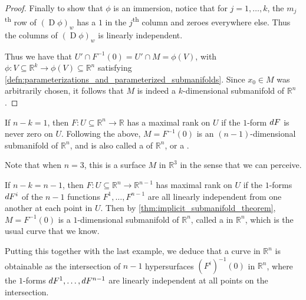 \documentclass[notoc,notitlepage]{tufte-book}
\DeclareMathOperator{\D}{D}
\begin{document}
\begin{proof}
  Finally to show that $\phi$ is an immersion, notice that for $j = 1, \ldots,
  k$, the $m_j$\textsuperscript{th} row of $(\D \phi)_w$ has a $1$ in the
  $j$\textsuperscript{th} column and zeroes everywhere else. Thus the columns of
  $(\D \phi)_w$ is linearly independent.

  Thus we have that $U' \cap F^{-1}(0) = U' \cap M = \phi(V)$, with $\phi : V
  \subseteq \mathbb{R}^k \to \phi(V) \subseteq \mathbb{R}^n$ satisfying
  \cref{defn:parameterizations_and_parameterized_submanifolds}. Since $x_0 \in M$
  was arbitrarily chosen, it follows that $M$ is indeed a $k$-dimensional
  submanifold of $\mathbb{R}^n$.
\end{proof}

\begin{eg}
  If $n - k = 1$, then $F : U \subseteq \mathbb{R}^n \to \mathbb{R}$ has a
  maximal rank on $U$ if the $1$-form $\mathop{}\!d{F}$ is never zero on $U$. Following
  the above, $M = F^{-1}(0)$ is an $(n - 1)$-dimensional submanifold of
  $\mathbb{R}^n$, and is also called a  of $\mathbb{R}^n$,
  or a .

  Note that when $n = 3$, this is a surface $M$ in $\mathbb{R}^3$ in the sense
  that we can perceive.
\end{eg}

\begin{eg}
  If $n - k = n - 1$, then $F : U \subseteq \mathbb{R}^n \to \mathbb{R}^{n - 1}$
  has maximal rank on $U$ if the $1$-forms $\mathop{}\!d{F}^i$ of the $n - 1$ functions
  $F^1, \ldots, F^{n - 1}$ are all linearly independent from one another at each
  point in $U$. Then by
  \cref{thm:implicit_submanifold_theorem}, $M =
  F^{-1}(0)$ is a $1$-dimensional submanifold of $\mathbb{R}^n$, called a
   in $\mathbb{R}^n$, which is the usual curve that we know.

  Putting this together with the last example, we deduce that a curve in
  $\mathbb{R}^n$ is obtainable as the intersection of $n - 1$ hypersurfaces
  $(F^i)^{-1}(0)$ in $\mathbb{R}^n$, where the $1$-forms $\mathop{}\!d{F}^1, \ldots,
  \mathop{}\!d{F}^{n - 1}$ are linearly independent at all points on the intersection.
\end{eg}
\end{document}

